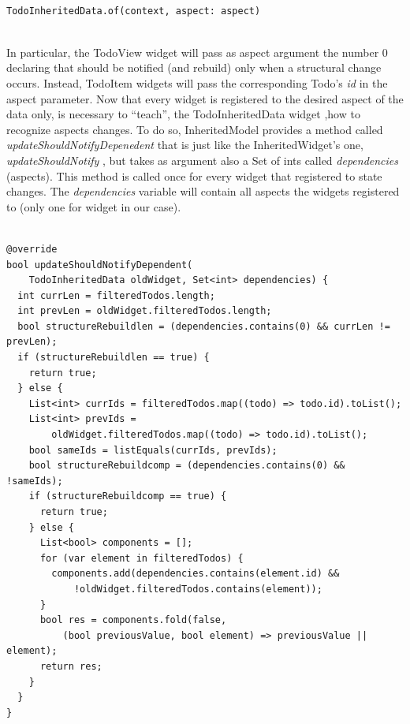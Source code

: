 \begin{code}
\label{code:2.47}
\begin{verbatim}

TodoInheritedData.of(context, aspect: aspect)
\end{verbatim}
\end{code}
\mbox{}\\
In particular, the TodoView widget will pass as aspect argument the number 0 declaring that should be notified (and rebuild) only when a structural change occurs.
Instead, TodoItem widgets will pass the corresponding Todo’s \textit{id} in the aspect parameter.
Now that every widget is registered to the desired aspect of the data only, is necessary to “teach”, the TodoInheritedData widget ,how to recognize aspects changes. To do so, InheritedModel provides a method called \textit{updateShouldNotifyDepenedent} that is just like the InheritedWidget’s one, \textit{updateShouldNotify }, but takes as argument also a Set of ints called \textit{dependencies }  (aspects). This method is called once for every widget that registered to state changes. The \textit{dependencies }  variable will contain all aspects the widgets registered to (only one for widget in our case). 
\mbox{}\\
\begin{code}
\mbox{}
\label{code:2.46}
\begin{verbatim}

@override
bool updateShouldNotifyDependent(
    TodoInheritedData oldWidget, Set<int> dependencies) {
  int currLen = filteredTodos.length;
  int prevLen = oldWidget.filteredTodos.length;
  bool structureRebuildlen = (dependencies.contains(0) && currLen != prevLen);
  if (structureRebuildlen == true) {
    return true;
  } else {
    List<int> currIds = filteredTodos.map((todo) => todo.id).toList();
    List<int> prevIds =
        oldWidget.filteredTodos.map((todo) => todo.id).toList();
    bool sameIds = listEquals(currIds, prevIds);
    bool structureRebuildcomp = (dependencies.contains(0) && !sameIds);
    if (structureRebuildcomp == true) {
      return true;
    } else {
      List<bool> components = [];
      for (var element in filteredTodos) {
        components.add(dependencies.contains(element.id) &&
            !oldWidget.filteredTodos.contains(element));
      }
      bool res = components.fold(false,
          (bool previousValue, bool element) => previousValue || element);
      return res;
    }
  }
}
\end{verbatim}
\end{code}

